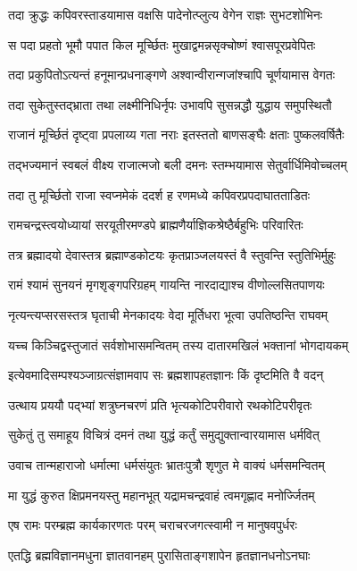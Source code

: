 \twolineshloka
{तदा क्रुद्धः कपिवरस्ताडयामास वक्षसि}
{पादेनोत्प्लुत्य वेगेन राज्ञः सुभटशोभिनः}%

\twolineshloka
{स पदा प्रहतो भूमौ पपात किल मूर्च्छितः}
{मुखाद्वमन्नसृक्चोष्णं श्वासपूरप्रवेपितः}%

\twolineshloka
{तदा प्रकुपितोऽत्यन्तं हनूमान्प्रधनाङ्गणे}
{अश्वान्वीरान्गजांश्चापि चूर्णयामास वेगतः}%

\twolineshloka
{तदा सुकेतुस्तद्भ्राता तथा लक्ष्मीनिधिर्नृपः}
{उभावपि सुसन्नद्धौ युद्धाय समुपस्थितौ}%

\twolineshloka
{राजानं मूर्च्छितं दृष्ट्वा प्रपलाय्य गता नराः}
{इतस्ततो बाणसङ्घैः क्षताः पुष्कलवर्षितैः}%

\twolineshloka
{तद्भज्यमानं स्वबलं वीक्ष्य राजात्मजो बली}
{दमनः स्तम्भयामास सेतुर्वार्धिमिवोच्चलम्}%

\twolineshloka
{तदा तु मूर्च्छितो राजा स्वप्नमेकं ददर्श ह}
{रणमध्ये कपिवरप्रपदाघातताडितः}%

\twolineshloka
{रामचन्द्रस्त्वयोध्यायां सरयूतीरमण्डपे}
{ब्राह्मणैर्याज्ञिकश्रेष्ठैर्बहुभिः परिवारितः}%

\twolineshloka
{तत्र ब्रह्मादयो देवास्तत्र ब्रह्माण्डकोटयः}
{कृतप्राञ्जलयस्तं वै स्तुवन्ति स्तुतिभिर्मुहुः}%

\twolineshloka
{रामं श्यामं सुनयनं मृगशृङ्गपरिग्रहम्}
{गायन्ति नारदाद्याश्च वीणोल्लसितपाणयः}%

\twolineshloka
{नृत्यन्त्यप्सरसस्तत्र घृताची मेनकादयः}
{वेदा मूर्तिधरा भूत्वा उपतिष्ठन्ति राघवम्}%

\twolineshloka
{यच्च किञ्चिद्वस्तुजातं सर्वशोभासमन्वितम्}
{तस्य दातारमखिलं भक्तानां भोगदायकम्}%

\twolineshloka
{इत्येवमादिसम्पश्यञ्जाग्रत्संज्ञामवाप सः}
{ब्रह्मशापहतज्ञानः किं दृष्टमिति वै वदन्}%

\twolineshloka
{उत्थाय प्रययौ पद्भ्यां शत्रुघ्नचरणं प्रति}
{भृत्यकोटिपरीवारो रथकोटिपरीवृतः}%

\twolineshloka
{सुकेतुं तु समाहूय विचित्रं दमनं तथा}
{युद्धं कर्तुं समुद्युक्तान्वारयामास धर्मवित्}%

\twolineshloka
{उवाच तान्महाराजो धर्मात्मा धर्मसंयुतः}
{भ्रातःपुत्रौ शृणुत मे वाक्यं धर्मसमन्वितम्}%

\twolineshloka
{मा युद्धं कुरुत क्षिप्रमनयस्तु महानभूत्}
{यद्रामचन्द्रवाहं त्वमगृह्णाद मनोर्ज्जितम्}%

\twolineshloka
{एष रामः परम्ब्रह्म कार्यकारणतः परम्}
{चराचरजगत्स्वामी न मानुषवपुर्धरः}%

\twolineshloka
{एतद्धि ब्रह्मविज्ञानमधुना ज्ञातवानहम्}
{पुरासिताङ्गशापेन हृतज्ञानधनोऽनघाः}%

